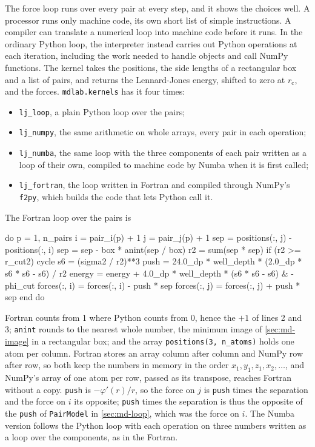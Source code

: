 The force loop runs over every pair at every step, and it shows the
choices well. A processor runs only machine code, its own short list of
simple instructions. A compiler can translate a numerical loop into machine code before it
runs. In the ordinary Python loop, the interpreter instead carries out
Python operations at each iteration, including the work needed to handle
objects and call NumPy functions. The kernel takes the
positions, the side lengths of a rectangular box and a list of pairs, and
returns the Lennard-Jones energy, shifted to zero at $r_{\mathrm c}$, and
the forces. \texttt{mdlab.kernels} has it four times:
\begin{itemize}
\item \texttt{lj\_loop}, a plain Python loop over the pairs;
\item \texttt{lj\_numpy}, the same arithmetic on whole arrays, every pair
   in each operation;
\item \texttt{lj\_numba}, the same loop with the three components of
   each pair written as a loop of their own, compiled to machine code by
   Numba when it is first called;
\item \texttt{lj\_fortran}, the loop written in Fortran and compiled
   through NumPy's \texttt{f2py}, which builds the code that lets Python
   call it.
\end{itemize}
The Fortran loop over the pairs is

\begin{code}[language={[95]Fortran}]
do p = 1, n_pairs
   i   = pair_i(p) + 1
   j   = pair_j(p) + 1
   sep = positions(:, j) - positions(:, i)
   sep = sep - box * anint(sep / box)
   r2  = sum(sep * sep)
   if (r2 >= r_cut2) cycle
   s6           = (sigma2 / r2)**3
   push         = 24.0_dp * well_depth * (2.0_dp * s6 * s6 - s6) / r2
   energy       = energy + 4.0_dp * well_depth * (s6 * s6 - s6)        &
                  - phi_cut
   forces(:, i) = forces(:, i) - push * sep
   forces(:, j) = forces(:, j) + push * sep
end do
\end{code}

\noindent Fortran counts from 1 where Python counts from 0, hence the
$+1$ of lines 2 and 3; \texttt{anint} rounds to the nearest whole number,
the minimum image of \cref{sec:md-image} in a rectangular box; and the
array \texttt{positions(3, n\_atoms)} holds one atom per column. Fortran
stores an array column after column and NumPy row after row, so both keep
the numbers in memory in the order $x_1, y_1, z_1, x_2, \dots$, and NumPy's
array of one atom per row, passed as its transpose, reaches Fortran
without a copy. \texttt{push} is $-\varphi'(r)/r$, so the force on $j$ is
\texttt{push} times the separation and the force on $i$ its opposite;
\texttt{push} times the separation is thus the opposite of the
\texttt{push} of \texttt{PairModel} in \cref{sec:md-loop}, which was the
force on $i$. The Numba version follows the Python loop with each
operation on three numbers written as a loop over the components, as in
the Fortran.


